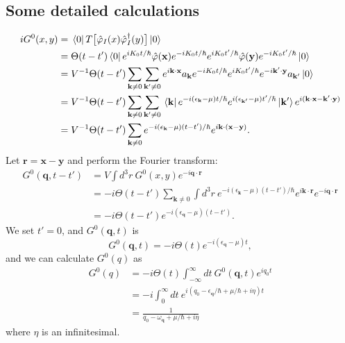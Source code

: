\documentclass[12pt]{article}
\begin{document}
\subsection*{Some detailed calculations}
\noindent\hrulefill
\begin{equation}
    \begin{split}
        iG^0(x,y)&=\bra*{0}T\big[\hat{\varphi}_I(x)\hat{\varphi}^\dagger_I(y)\big]
        \ket*{0}\\
        &=\Theta(t-t')\bra*{0}e^{iK_0t/\hbar}\hat{\varphi}(\mathbf{x})e^{-iK_0t/\hbar}
        e^{iK_0t'/\hbar}\hat{\varphi}(\mathbf{y})e^{-iK_0t'/\hbar}\ket*{0}\\
        &=V^{-1}\Theta(t-t')\sum_{\mathbf{k}\neq 0}\sum_{\mathbf{k}'\neq 0}e^{i
        \mathbf{k}\cdot\mathbf{x}}a_{\mathbf{k}}e^{-iK_0t/\hbar}e^{iK_0t'/\hbar}
        e^{-i\mathbf{k}'\cdot\mathbf{y}}a_{\mathbf{k}'}\ket*{0}\\
        &=V^{-1}\Theta(t-t')\sum_{\mathbf{k}\neq 0}\sum_{\mathbf{k}'\neq 0}\bra*{
        \mathbf{k}}e^{-i(\epsilon_{\mathbf{k}}-\mu)t/\hbar}e^{i(\epsilon_{\mathbf{k}'}
        -\mu)t'/\hbar}\ket*{\mathbf{k}'}e^{i(\mathbf{k}\cdot\mathbf{x}-\mathbf{k}'
        \cdot\mathbf{y})}\\
        &=V^{-1}\Theta(t-t')\sum_{\mathbf{k}\neq 0}e^{-i(\epsilon_{\mathbf{k}}-\mu)
        (t-t')/\hbar}e^{i\mathbf{k}\cdot(\mathbf{x}-\mathbf{y})}.
    \end{split}
\end{equation}
Let $\mathbf{r}=\mathbf{x}-\mathbf{y}$ and perform the Fourier transform:
\begin{equation}
    \begin{split}
        G^0(\mathbf{q},t-t')&=V\int d^3r\ G^0(x,y)e^{-i\mathbf{q}\cdot\mathbf{r}}\\
        &=-i\Theta(t-t')\sum_{\mathbf{k}\neq 0}\int d^3r\ e^{-i(\epsilon_{\mathbf{k}}
        -\mu)(t-t')/\hbar}e^{i\mathbf{k}\cdot\mathbf{r}}e^{-i\mathbf{q}\cdot\mathbf{r}}\\
        &=-i\Theta(t-t')e^{-i(\epsilon_{\mathbf{q}}-\mu)(t-t')}.
    \end{split}
\end{equation}
We set $t'=0$, and $G^0(\mathbf{q},t)$ is 
\begin{equation}
    G^0(\mathbf{q},t)=-i\Theta(t)e^{-i(\epsilon_{\mathbf{q}}-\mu)t},
\end{equation}
and we can calculate $G^0(q)$ as
\begin{equation}
    \begin{split}
        G^0(q)&=-i\Theta(t)\int_{-\infty}^\infty dt\ G^0(\mathbf{q},t)e^{iq_0 t}\\
        &=-i\int_0^\infty dt\ e^{i(q_0-\epsilon_{\mathbf{q}}/\hbar+\mu/\hbar+i\eta)t}\\
        &=\frac{1}{q_0-\omega_{\mathbf{q}}+\mu/\hbar+i\eta}
    \end{split}
\end{equation}
where $\eta$ is an infinitesimal.
\end{document}
